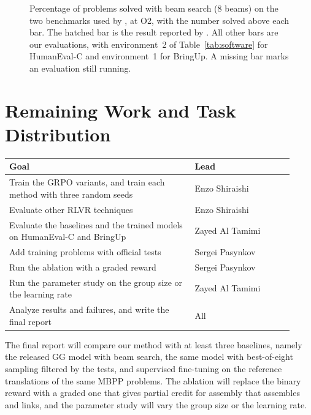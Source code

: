\documentclass{article}
\begin{document}
\begin{figure}[h]
\centering

\caption{Percentage of problems solved with beam search (8 beams) on the two benchmarks used by \citet{gg}, at O2, with the number solved above each bar. The hatched bar is the result reported by \citet{gg}. All other bars are our evaluations, with environment~2 of Table~\ref{tab:software} for HumanEval-C and environment~1 for BringUp. A missing bar marks an evaluation still running.}
\label{fig:main}
\end{figure}

\section{\texorpdfstring{Remaining Work and Task Distribution}{Remaining Work and Task Distribution}}
\label{sec:remaining}

\begin{center}
\small


%
\begin{tabular}{p{0.6\linewidth} p{0.32\linewidth}}
\toprule
\textbf{Goal} & \textbf{Lead} \\
\midrule
Train the GRPO variants, and train each method with three random seeds & Enzo Shiraishi \\
Evaluate other RLVR techniques & Enzo Shiraishi \\
Evaluate the baselines and the trained models on HumanEval-C and BringUp & Zayed Al Tamimi \\
Add training problems with official tests & Sergei Pasynkov \\
Run the ablation with a graded reward & Sergei Pasynkov \\
Run the parameter study on the group size or the learning rate & Zayed Al Tamimi \\
Analyze results and failures, and write the final report & All \\
\bottomrule
\end{tabular}
\end{center}

The final report will compare our method with at least three baselines, namely the released GG model with beam search, the same model with best-of-eight sampling filtered by the tests, and supervised fine-tuning on the reference translations of the same MBPP problems. The ablation will replace the binary reward with a graded one that gives partial credit for assembly that assembles and links, and the parameter study will vary the group size or the learning rate. 
\end{document}
